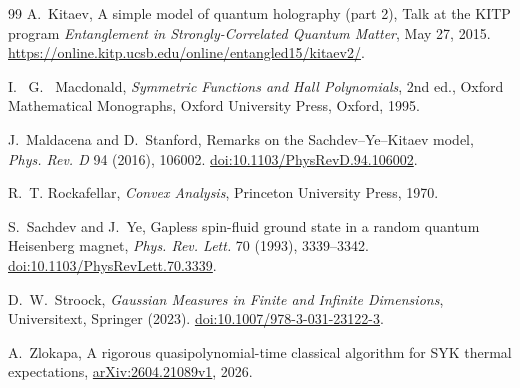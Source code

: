 \documentclass[11pt]{article}
\theoremstyle{remark}
\begin{document}
\begin{thebibliography}{99}
A.~Kitaev,
\newblock A simple model of quantum holography (part 2),
\newblock Talk at the KITP program \emph{Entanglement in Strongly-Correlated
Quantum Matter}, May 27, 2015.
\newblock \url{https://online.kitp.ucsb.edu/online/entangled15/kitaev2/}.

I.~ G.~ Macdonald,
\newblock \emph{Symmetric Functions and Hall Polynomials},
\newblock 2nd ed.,
\newblock Oxford Mathematical Monographs,
\newblock Oxford University Press, Oxford, 1995.

J.~Maldacena and D.~Stanford,
\newblock Remarks on the Sachdev--Ye--Kitaev model,
\newblock \emph{Phys. Rev. D} 94 (2016), 106002.
\newblock \href{https://doi.org/10.1103/PhysRevD.94.106002}
{doi:10.1103/PhysRevD.94.106002}.



R.~T. Rockafellar,
\newblock \emph{Convex Analysis},
\newblock Princeton University Press, 1970.

S.~Sachdev and J.~Ye,
\newblock Gapless spin-fluid ground state in a random quantum Heisenberg
magnet,
\newblock \emph{Phys. Rev. Lett.} 70 (1993), 3339--3342.
\newblock \href{https://doi.org/10.1103/PhysRevLett.70.3339}
{doi:10.1103/PhysRevLett.70.3339}.

D.~W.~Stroock,
\newblock \emph{Gaussian Measures in Finite and Infinite Dimensions},
\newblock Universitext, Springer (2023).
\newblock \href{https://doi.org/10.1007/978-3-031-23122-3}
{doi:10.1007/978-3-031-23122-3}.



A.~Zlokapa,
\newblock A rigorous quasipolynomial-time classical algorithm for SYK thermal
expectations,
\newblock \href{https://arxiv.org/abs/2604.21089}
{arXiv:2604.21089v1}, 2026.
\end{thebibliography}
\end{document}
